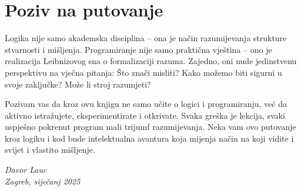 \section*{Poziv na putovanje}

Logika nije samo akademska disciplina – ona je način razumijevanja strukture stvarnosti i mišljenja. Programiranje nije samo praktična vještina – ono je realizacija Leibnizovog sna o formalizaciji razuma. Zajedno, oni nude jedinstvenu perspektivu na vječna pitanja: Što znači misliti? Kako možemo biti sigurni u svoje zaključke? Može li stroj razumjeti?

Pozivam vas da kroz ovu knjigu ne samo učite o logici i programiranju, već da aktivno istražujete, eksperimentirate i otkrivate. Svaka greška je lekcija, svaki uspješno pokrenut program mali trijumf razumijevanja. Neka vam ovo putovanje kroz logiku i kod bude intelektualna avantura koja mijenja način na koji vidite i svijet i vlastito mišljenje.

\vspace{1cm}
\begin{flushright}
\textit{Davor Lauc}\\
\textit{Zagreb, siječanj 2025}
\end{flushright}